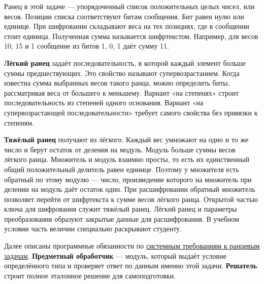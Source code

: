\documentclass[12pt,a4paper]{article}
\begin{document}
\hypertarget{как-устроена-ранцевая-задача}{}

Ранец в этой задаче --- упорядоченный список положительных целых чисел, или весов. Позиции списка соответствуют битам сообщения. Бит равен нулю или единице. При шифровании складывают веса на тех позициях, где в сообщении стоит единица. Полученная сумма называется шифртекстом. Например, для весов 10, 15 и 1 сообщение из битов 1, 0, 1 даёт сумму 11.

\textbf{Лёгкий ранец} задаёт последовательность, в которой каждый элемент больше суммы предшествующих. Это свойство называют супервозрастанием. Когда известна сумма выбранных весов такого ранца, можно определить биты, рассматривая веса от большего к меньшему. Вариант «на степенях» строит последовательность из степеней одного основания. Вариант «на супервозрастающей последовательности» требует самого свойства без привязки к степеням.

\textbf{Тяжёлый ранец} получают из лёгкого. Каждый вес умножают на одно и то же число и берут остаток от деления на модуль. Модуль больше суммы весов лёгкого ранца. Множитель и модуль взаимно просты, то есть их единственный общий положительный делитель равен единице. Поэтому у множителя есть обратный по этому модулю --- число, произведение которого на множитель при делении на модуль даёт остаток один. При расшифровании обратный множитель позволяет перейти от шифртекста к сумме весов лёгкого ранца. Открытой частью ключа для шифрования служит тяжёлый ранец. Лёгкий ранец и параметры преобразования образуют закрытые данные для расшифрования. В учебном условии часть величин специально раскрывают студенту.

Далее описаны программные обязанности по {\href{../04\_Системные\_требования/DOC-05\_Системные\_требования.pdf\#doc-05-требования-к-ранцевым-задачам}{системным требованиям к ранцевым задачам}}. \textbf{Предметный обработчик} --- модуль, который выдаёт условие определённого типа и проверяет ответ по данным именно этой задачи. \textbf{Решатель} строит полное эталонное решение для самоподготовки.
\end{document}

